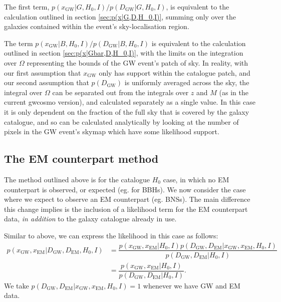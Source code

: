 \documentclass[a4paper,10pt]{article}
\begin{document}
The first term, $p(x_{\text{GW}}|G,H_0,I)/p(D_{\text{GW}}|G,H_0,I)$, is equivalent to the calculation outlined in section \ref{sec:p(x|G,D,H_0,I)}, summing only over the galaxies contained within the event's sky-localisation region.

The term $p(x_{\text{GW}}|B,H_0,I)/p(D_{\text{GW}}|B,H_0,I)$ is equivalent to the calculation outlined in section \ref{sec:p(x|Gbar,D,H_0,I)}, with the limits on the integration over $\Omega$ representing the bounds of the GW event's patch of sky.  In reality, with our first assumption that $x_{\text{GW}}$ only has support within the catalogue patch, and our second assumption that $p(D_{\text{GW}})$ is uniformly averaged across the sky, the integral over $\Omega$ can be separated out from the integrals over $z$ and $M$ (as in the current gwcosmo version), and calculated separately as a single value.  In this case it is only dependent on the fraction of the full sky that is covered by the galaxy catalogue, and so can be calculated analytically by looking at the number of pixels in the GW event's skymap which have some likelihood support.





\subsection{The EM counterpart method}
The method outlined above is for the catalogue $H_0$ case, in which no EM counterpart is observed, or expected (eg. for BBHs).  We now consider the case where we expect to observe an EM counterpart (eg. BNSs).  The main difference this change implies is the inclusion of a likelihood term for the EM counterpart data, \emph{in addition} to the galaxy catalogue already in use.

Similar to above, we can express the likelihood in this case as follows:
\begin{equation}
\begin{aligned}
p(x_{\text{GW}},x_{\text{EM}}|D_{\text{GW}},D_{\text{EM}},H_0,I) &= \dfrac{p(x_{\text{GW}},x_{\text{EM}}|H_0,I) p(D_{\text{GW}},D_{\text{EM}}|x_{\text{GW}},x_{\text{EM}},H_0,I)}{p(D_{\text{GW}},D_{\text{EM}}|H_0,I)}
\\&= \dfrac{p(x_{\text{GW}},x_{\text{EM}}|H_0,I)}{p(D_{\text{GW}},D_{\text{EM}}|H_0,I)}.
\end{aligned} 
\end{equation}
We take $p(D_{\text{GW}},D_{\text{EM}}|x_{\text{GW}},x_{\text{EM}},H_0,I)=1$ whenever we have GW and EM data.
\end{document}

